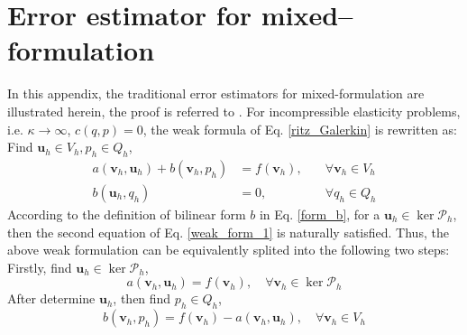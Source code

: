 \section{Error estimator for mixed--formulation}
In this appendix, the traditional error estimators for mixed-formulation are illustrated herein, the proof is referred to \cite{brenner2008}.
For incompressible elasticity problems, i.e. $\kappa\rightarrow\infty$, $c(q,p)=0$, the weak formula of Eq. \eqref{ritz_Galerkin} is rewritten as:
Find $\boldsymbol u_h \in V_h, p_h \in Q_h$,
\begin{equation}\label{weak_form_1}
\begin{aligned}
    a(\boldsymbol v_h,\boldsymbol u_h) + b(\boldsymbol v_h,p_h) &= f(\boldsymbol v_h), \quad &\forall \boldsymbol v_h \in V_h \\
    b(\boldsymbol u_h,q_h) &= 0, \quad &\forall q_h \in Q_h
\end{aligned}
\end{equation}
According to the definition of bilinear form $b$ in Eq. \eqref{form_b},
for a $\boldsymbol u_h \in \ker \mathcal P_h$, then the second equation of Eq. \eqref{weak_form_1} is naturally satisfied. Thus, 
the above weak formulation can be equivalently splited into the following two steps: Firstly, 
find $\boldsymbol u_h \in \ker \mathcal P_h$,
\begin{equation} \label{weak_form_2}
a(\boldsymbol v_h,\boldsymbol u_h) = f(\boldsymbol v_h), \quad \forall \boldsymbol v_h \in \ker \mathcal P_h
\end{equation}
After determine $\boldsymbol u_h$, then find $p_h \in Q_h$,
\begin{equation}\label{weak_form_3}
b(\boldsymbol v_h, p_h) = f(\boldsymbol v_h) - a(\boldsymbol v_h, \boldsymbol u_h), \quad \forall \boldsymbol v_h \in V_h
\end{equation}

